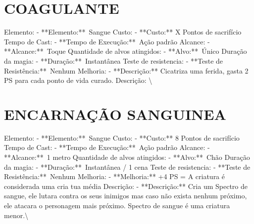 \documentclass{article}%
\begin{document}
\section{COAGULANTE}%
\label{sec:COAGULANTE}%
Elemento: {-} **Elemento:**~Sangue\newline%
Custo: {-} **Custo:** X Pontos de sacrifício\newline%
Tempo de Cast: {-} **Tempo de Execução:**~Ação padrão\newline%
Alcance: {-} **Alcance:**~Toque\newline%
Quantidade de alvos atingidos: {-} **Alvo:**~Único\newline%
Duração da magia: {-} **Duração:**~Instantânea\newline%
Teste de resistencia: {-} **Teste de Resistência:**~Nenhum\newline%
Melhoria: {-} **Descrição:** Cicatriza uma ferida, gasta 2 PS para cada ponto de vida curado.\newline%
Descrição: \textbackslash{}

%
\section{ENCARNAÇÃO SANGUINEA}%
\label{sec:ENCARNAOSANGUINEA}%
Elemento: {-} **Elemento:**~Sangue\newline%
Custo: {-} **Custo:** 8 Pontos de sacrifício\newline%
Tempo de Cast: {-} **Tempo de Execução:**~Ação padrão\newline%
Alcance: {-} **Alcance:**~1 metro\newline%
Quantidade de alvos atingidos: {-} **Alvo:**~Chão\newline%
Duração da magia: {-} **Duração:**~Instantânea / 1 cena\newline%
Teste de resistencia: {-} **Teste de Resistência:**~Nenhum\newline%
Melhoria: {-} **Melhoria:** +4 PS = A criatura é considerada uma cria tua média\newline%
Descrição: {-} **Descrição:** Cria um Spectro de sangue, ele lutara contra os seus inimigos mas caso não exista nenhum próximo, ele atacara o personagem mais próximo. Spectro de sangue é uma criatura menor.\textbackslash{}

%
\end{document}
